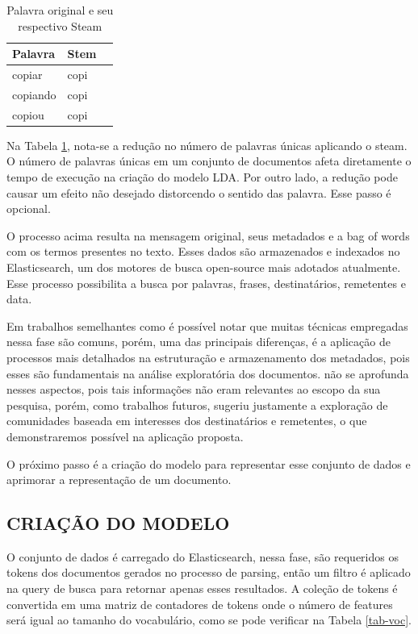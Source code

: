 \documentclass[12pt,a4paper]{article}
\begin{document}
\begin{enumerate}
\begin{table}[h]
  \centering
  \begin{tabular}{l l l}
  Palavra		&Stem &\\
  \hline
  copiar		&copi &\\
  copiando		&copi &\\
  copiou		&copi &\\
  \hline
  \end{tabular}
  \caption{Palavra original e seu respectivo Steam}
  \label{tab-stem}
\end{table}

Na Tabela \ref{tab-stem}, nota-se a redução no número de palavras únicas aplicando o steam. O número de palavras únicas em um conjunto de documentos afeta diretamente o tempo de execução na criação do modelo LDA.
 Por outro lado, a redução pode causar um efeito não desejado distorcendo o sentido das palavra. Esse passo é opcional.
\end{enumerate}


O processo acima resulta na mensagem original, seus metadados e a bag of words com os termos presentes no texto. Esses dados são armazenados e indexados no Elasticsearch,
 um dos motores de busca open-source mais adotados atualmente. Esse processo possibilita a busca por palavras, frases, destinatários, remetentes e data. 

Em trabalhos semelhantes como  é possível notar que muitas técnicas empregadas nessa fase são comuns, porém, uma das principais diferenças,
 é a aplicação de processos mais detalhados na estruturação e armazenamento dos metadados, pois esses são fundamentais na análise exploratória dos documentos.
  não se aprofunda nesses aspectos, pois tais informações não eram relevantes ao escopo da sua pesquisa,
 porém, como trabalhos futuros, sugeriu justamente a exploração de comunidades baseada em interesses dos destinatários e remetentes, o que demonstraremos possível na aplicação proposta.

O próximo passo é a criação do modelo para representar esse conjunto de dados e aprimorar a representação de um documento.



\subsection{CRIAÇÃO DO MODELO}
O conjunto de dados é carregado do Elasticsearch, nessa fase, são requeridos os tokens dos documentos gerados no processo de parsing, então
 um filtro é aplicado na query de busca para retornar apenas esses resultados. A coleção de tokens é convertida em uma matriz de contadores de tokens onde o número de features será igual ao tamanho do vocabulário, como se pode verificar na Tabela \ref{tab-voc}.
\end{document}
